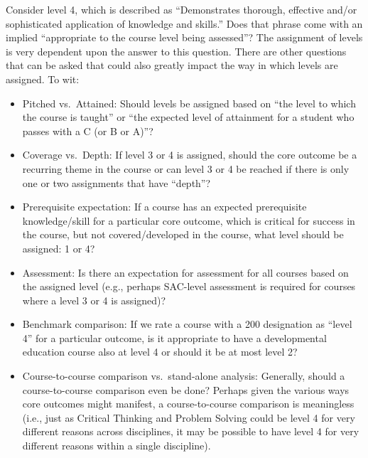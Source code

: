 Consider level 4, which is described as ``Demonstrates thorough, effective
and/or sophisticated application
of knowledge and skills.''  Does that phrase come with an implied ``appropriate
to the course level being assessed''?  The assignment of levels is very
dependent upon the answer to this question.  There are other questions that can
be asked that could also greatly impact the way in which levels are assigned.
To wit:
\begin{itemize}
\item Pitched vs.\ Attained: Should levels be assigned based on ``the level to
  which the course is taught'' or ``the expected level of attainment for a
  student who passes with a C (or B or A)''?

\item Coverage vs.\ Depth: If level 3 or 4 is assigned, should the core outcome
  be a recurring theme in the course or can level 3 or 4 be reached if there is
  only one or two assignments that have ``depth''?

\item Prerequisite expectation: If a course has an expected prerequisite
  knowledge/skill for a particular core outcome, which is critical for success
  in the course, but not covered/developed in the course, what level should be
  assigned: 1 or 4?

\item Assessment: Is there an expectation for assessment for all courses based
  on the assigned level (e.g., perhaps SAC-level assessment is required for
  courses where a level 3 or 4 is assigned)?

\item Benchmark comparison: If we rate a course with a 200 designation as
  ``level 4'' for a particular outcome, is it appropriate to have a
  developmental education course also at level 4 or should it be at most level
  2?

\item Course-to-course comparison vs.\ stand-alone analysis: Generally, should
  a course-to-course comparison even be done? Perhaps given the various ways
  core outcomes might manifest, a course-to-course comparison is meaningless
  (i.e., just as Critical Thinking and Problem Solving could be level 4 for
  very different reasons across disciplines, it may be possible to have level 4
  for very different reasons within a single discipline).
\end{itemize}


